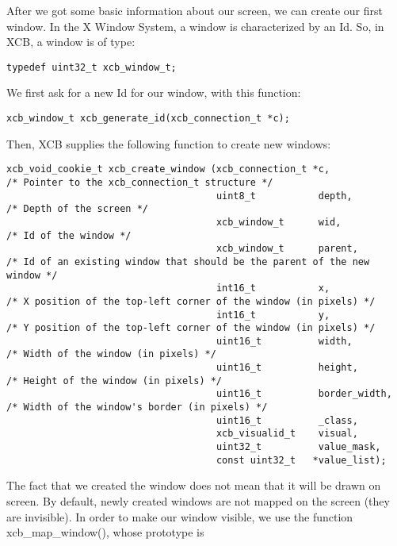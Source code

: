 \documentclass[12pt,oneside,titlepage]{book}
\begin{document}
\begin{enumerate}
  After we got some basic information about our screen, we can create
  our first window. In the X Window System, a window is characterized by
  an Id. So, in XCB, a window is of type:

\begin{verbatim}
typedef uint32_t xcb_window_t;
\end{verbatim}

  We first ask for a new Id for our window, with this function:

\begin{verbatim}
xcb_window_t xcb_generate_id(xcb_connection_t *c);
\end{verbatim}

  Then, XCB supplies the following function to create new windows:

\begin{verbatim}
xcb_void_cookie_t xcb_create_window (xcb_connection_t *c,             /* Pointer to the xcb_connection_t structure */
                                     uint8_t           depth,         /* Depth of the screen */
                                     xcb_window_t      wid,           /* Id of the window */
                                     xcb_window_t      parent,        /* Id of an existing window that should be the parent of the new window */
                                     int16_t           x,             /* X position of the top-left corner of the window (in pixels) */
                                     int16_t           y,             /* Y position of the top-left corner of the window (in pixels) */
                                     uint16_t          width,         /* Width of the window (in pixels) */
                                     uint16_t          height,        /* Height of the window (in pixels) */
                                     uint16_t          border_width,  /* Width of the window's border (in pixels) */
                                     uint16_t          _class,
                                     xcb_visualid_t    visual,
                                     uint32_t          value_mask,
                                     const uint32_t   *value_list);
\end{verbatim}

  The fact that we created the window does not mean that it will be
  drawn on screen. By default, newly created windows are not mapped on
  the screen (they are invisible). In order to make our window visible,
  we use the function {xcb\_map\_window()}, whose prototype is


\end{enumerate}
\end{document}
